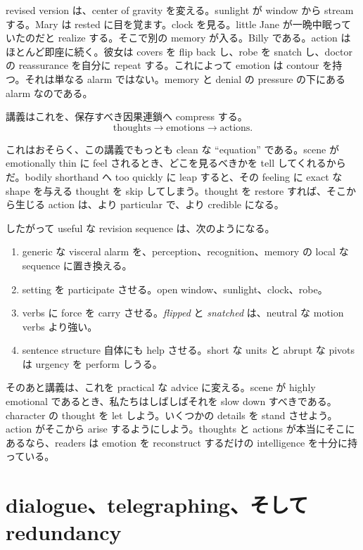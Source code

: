 revised version は、center of gravity を変える。sunlight が window から stream する。Mary は rested に目を覚ます。clock を見る。little Jane が一晩中眠っていたのだと realize する。そこで別の memory が入る。Billy である。action はほとんど即座に続く。彼女は covers を flip back し、robe を snatch し、doctor の reassurance を自分に repeat する。これによって emotion は contour を持つ。それは単なる alarm ではない。memory と denial の pressure の下にある alarm なのである。

講義はこれを、保存すべき因果連鎖へ compress する。
\begin{equation}
\text{thoughts} \to \text{emotions} \to \text{actions}.
\end{equation}

これはおそらく、この講義でもっとも clean な ``equation'' である。scene が emotionally thin に feel されるとき、どこを見るべきかを tell してくれるからだ。bodily shorthand へ too quickly に leap すると、その feeling に exact な shape を与える thought を skip してしまう。thought を restore すれば、そこから生じる action は、より particular で、より credible になる。

したがって useful な revision sequence は、次のようになる。
\begin{enumerate}
\item generic な visceral alarm を、perception、recognition、memory の local な sequence に置き換える。
\item setting を participate させる。open window、sunlight、clock、robe。
\item verbs に force を carry させる。\emph{flipped} と \emph{snatched} は、neutral な motion verbs より強い。
\item sentence structure 自体にも help させる。short な units と abrupt な pivots は urgency を perform しうる。
\end{enumerate}

そのあと講義は、これを practical な advice に変える。scene が highly emotional であるとき、私たちはしばしばそれを slow down すべきである。character の thought を let しよう。いくつかの details を stand させよう。action がそこから arise するようにしよう。thoughts と actions が本当にそこにあるなら、readers は emotion を reconstruct するだけの intelligence を十分に持っている。

\section{dialogue、telegraphing、そして redundancy}

